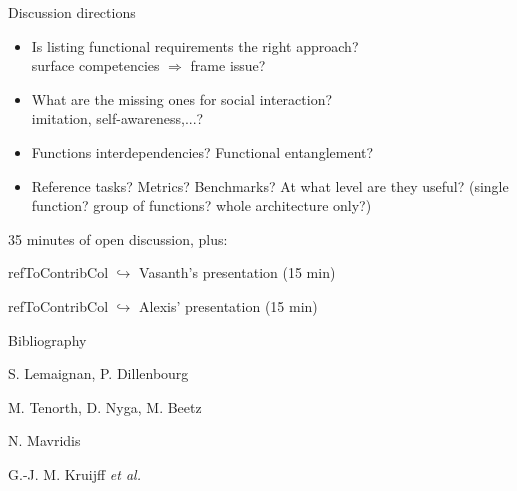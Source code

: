 \documentclass[compress]{beamer}
\newcommand{\refToContrib}[1]{%
    \begin{beamercolorbox}[wd=\linewidth,ht=2ex,dp=0.7ex]{refToContribCol}%
    \hspace{0.5em}$\hookrightarrow$ #1%
    \end{beamercolorbox}%
}%
\begin{document}
\begin{frame}{Discussion directions}
    

    \begin{itemize}
        \item Is listing functional requirements the right approach?\\ {\Medium surface competencies $\Rightarrow$ frame issue?}
        \item What are the missing ones for social interaction?\\ {\Medium imitation, self-awareness,...?}
        \item Functions interdependencies? Functional entanglement?
        \item Reference tasks? Metrics? Benchmarks? At what level are they useful? (single function? group of functions? whole architecture only?)
    \end{itemize}

    35 minutes of open discussion, plus:
    \refToContrib{Vasanth's presentation (15 min)}
    \refToContrib{Alexis' presentation (15 min)}

\end{frame}


\begin{frame}{Bibliography}
\begin{thebibliography}{10}

    \beamertemplatearticlebibitems
    S. Lemaignan, P. Dillenbourg
    \newblock {}

    \beamertemplatearticlebibitems
    M. Tenorth, D. Nyga, M. Beetz
    \newblock {}

    \beamertemplatearticlebibitems
    N. Mavridis
    \newblock {}



    \beamertemplatearticlebibitems
    G.-J. M. Kruijff \emph{et al.}
    \newblock {}



  \end{thebibliography}
\end{frame}
\end{document}
